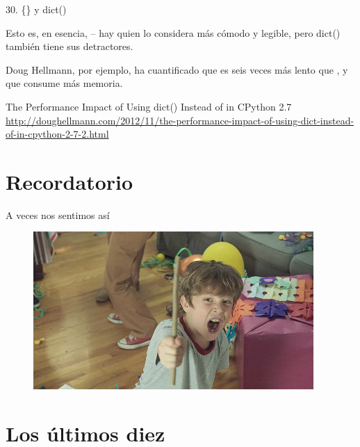 \documentclass[14pt]{beamer}
\begin{document}
\begin{frame}[fragile]{30. \{\} y dict()}
  \begin{alertblock}{}
    \centering
    Esto es, en esencia,  -- hay
    quien lo considera más cómodo y legible, pero dict() también tiene
    sus detractores.
  \end{alertblock}

  \vspace{0.5cm}

  \footnotesize
  \begin{center}
    \centering
    Doug Hellmann, por ejemplo, ha cuantificado que es seis veces más
    lento que {}, y que consume más memoria.
  \end{center}

  \footnotesize
    \begin{block}
    {\centering The Performance Impact of Using dict() Instead of {} in CPython 2.7}
    \centering
    \url{http://doughellmann.com/2012/11/the-performance-impact-of-using-dict-instead-of-in-cpython-2-7-2.html}
  \end{block}
\end{frame}

\section{Recordatorio}
\begin{frame}[fragile]{A veces nos sentimos así}
  \begin{figure}
    \centering
    \includegraphics[height=6cm]{pics/un-palo.jpg}
  \end{figure}
\end{frame}

\section{Los últimos diez}
\end{document}
